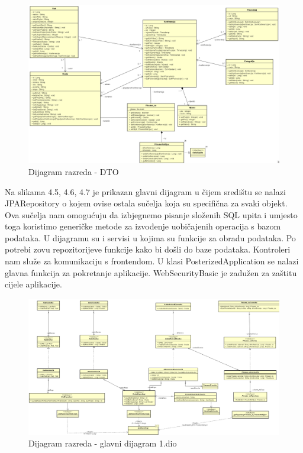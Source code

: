 			\begin{figure}[H]
				\includegraphics[scale=0.4]{slike/dto_klase.png}%
				\centering
				\caption{Dijagram razreda - DTO}
				\label{fig:promjena9}
			\end{figure}
			

			Na slikama 4.5, 4.6, 4.7 je prikazan glavni dijagram u čijem središtu se nalazi JPARepository o kojem ovise ostala sučelja koja su specifična za svaki objekt. Ova sučelja nam omogućuju da izbjegnemo pisanje složenih SQL upita i umjesto toga koristimo generičke metode za izvođenje uobičajenih operacija s bazom podataka.
U dijagramu su i servisi u kojima su funkcije za obradu podataka. Po potrebi zovu repozitorijeve funkcije kako bi došli do baze podataka.
Kontroleri nam služe za komunikaciju s frontendom. 
U klasi PosterizedApplication se nalazi glavna funkcija za pokretanje aplikacije. WebSecurityBasic je zadužen za zaštitu cijele aplikacije.

			

			\begin{figure}[H]
				\includegraphics[scale=0.4]{slike/glavni_1.png}%
				\centering
				\caption{Dijagram razreda - glavni dijagram 1.dio}
				\label{fig:promjena9.1}
			\end{figure}
			
